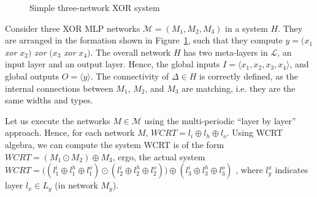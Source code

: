 
\begin{figure}[t]
	\centering
	\scalebox{0.8}{}
	\caption{Simple three-network XOR system}
	\label{fig:three-xor}
\end{figure}

\begin{example}
	\label{ex:simple-xor}
	Consider three XOR \ac{MLP} networks $\mathcal{M} = \left(M_1, M_2, M_3\right)$ in a system $H$.
	They are arranged in the formation shown in Figure~\ref{fig:three-xor}, such that they compute $y = \big(x_1$ \textit{xor} $x_2\big)$ \textit{xor} $\big(x_3$ \textit{xor} $x_4\big)$.
	The overall network $H$ has two meta-layers in $\mathcal{L}$, an input layer and an output layer. 
	Hence, the global inputs $I = \langle x_1, x_2, x_3, x_4 \rangle$, and global outputs $O = \langle y \rangle$.
	The connectivity of $\Delta \in H$ is correctly defined, as the internal connections between $M_1$, $M_2$, and $M_3$ are matching, i.e. they are the same widths and types. 
	
	Let us execute the networks $M \in \mathcal{M}$ using the multi-periodic ``layer by layer'' approach. 
	Hence, for each network $M$, $WCRT = l_i \oplus l_h \oplus l_o$.
	Using \ac{WCRT} algebra, we can compute the system WCRT is of the form $WCRT = \left(M_1 \odot M_2\right) \oplus M_3$, ergo, the actual system \\ $WCRT = \Big(\left(l_1^i \oplus l_1^h \oplus l_1^o\right) \odot \left(l_2^i \oplus l_2^h \oplus l_2^o\right)\Big) \oplus \left(l_3^i \oplus l_3^h \oplus l_3^o\right)$ , where $l^x_y$ indicates layer $l_x \in L_y$ (in network $M_y$).
\end{example}

